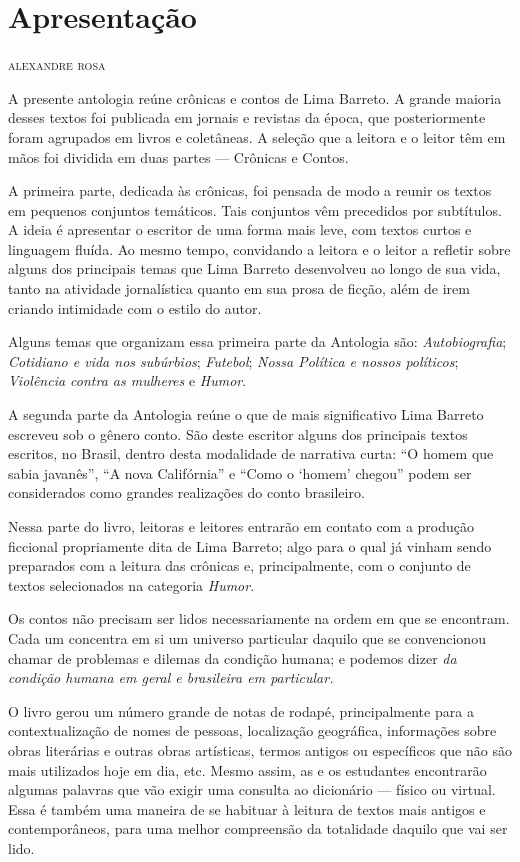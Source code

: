 \chapter{Apresentação}

\begin{flushright}
\textsc{alexandre rosa}
\end{flushright}

\noindent{}A presente antologia reúne crônicas e contos de Lima Barreto. A grande
maioria desses textos foi publicada em jornais e revistas da época, que
posteriormente foram agrupados em livros e coletâneas. A seleção que a
leitora e o leitor têm em mãos foi dividida em duas partes --- Crônicas e
Contos.

A primeira parte, dedicada às crônicas, foi pensada de modo a reunir os
textos em pequenos conjuntos temáticos. Tais conjuntos vêm precedidos
por subtítulos. A ideia é apresentar o escritor de uma forma mais leve,
com textos curtos e linguagem fluída. Ao mesmo tempo, convidando a
leitora e o leitor a refletir sobre alguns dos principais temas que Lima
Barreto desenvolveu ao longo de sua vida, tanto na atividade
jornalística quanto em sua prosa de ficção, além de irem criando
intimidade com o estilo do autor.

Alguns temas que organizam essa primeira parte da Antologia são:
\textit{Autobiografia}; \textit{Cotidiano e vida nos subúrbios};
\textit{Futebol}; \textit{Nossa Política e nossos políticos};
\textit{Violência contra as mulheres} e \textit{Humor}.

A segunda parte da Antologia reúne o que de mais significativo Lima
Barreto escreveu sob o gênero conto. São deste escritor alguns dos
principais textos escritos, no Brasil, dentro desta modalidade de
narrativa curta: ``O homem que sabia javanês'', ``A nova Califórnia'' e
``Como o `homem' chegou'' podem ser considerados como grandes
realizações do conto brasileiro.

Nessa parte do livro, leitoras e leitores entrarão em contato com a
produção ficcional propriamente dita de Lima Barreto; algo para o qual
já vinham sendo preparados com a leitura das crônicas e, principalmente,
com o conjunto de textos selecionados na categoria \emph{Humor}.

Os contos não precisam ser lidos necessariamente na ordem em que se
encontram. Cada um concentra em si um universo particular daquilo que se
convencionou chamar de problemas e dilemas da condição humana; e podemos
dizer \emph{da condição humana em geral e brasileira em particular.}

O livro gerou um número grande de notas de rodapé, principalmente para a
contextualização de nomes de pessoas, localização geográfica,
informações sobre obras literárias e outras obras artísticas, termos
antigos ou específicos que não são mais utilizados hoje em dia, etc.
Mesmo assim, as e os estudantes encontrarão algumas palavras que vão
exigir uma consulta ao dicionário --- físico ou virtual. Essa é também
uma maneira de se habituar à leitura de textos mais antigos e
contemporâneos, para uma melhor compreensão da totalidade daquilo que
vai ser lido.
